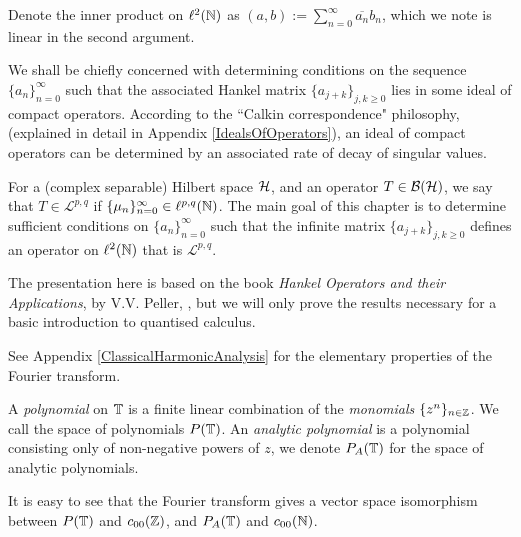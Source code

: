Denote the inner product on $\ell^2(\mathbb{N})$ 
as $(a,b) := \sum_{n=0}^\infty \overline{a_n}b_n$, which we note
is linear in the second argument.

We shall be chiefly concerned with determining conditions on the sequence $\{a_n\}_{n=0}^\infty$
such that the associated Hankel matrix $\{a_{j+k}\}_{j,k\geq 0}$ lies in some ideal
of compact operators. According to the ``Calkin correspondence" philosophy, (explained
in detail in Appendix \ref{IdealsOfOperators}), an ideal of compact operators
can be determined by an associated rate of decay of singular values.

For a (complex separable) Hilbert space $\mathcal{H}$, and an operator $T \in \mathcal{B}(\mathcal{H})$, 
we say that $T \in \mathcal{L}^{p,q}$ if $\{\mu_n\}_{n=0}^\infty \in \ell^{p,q}(\mathbb{N})$.
The main goal of this chapter is to determine sufficient conditions on $\{a_n\}_{n=0}^\infty$
such that the infinite matrix $\{a_{j+k}\}_{j,k\geq 0}$ defines an operator
on $\ell^2(\mathbb{N})$ that is $\mathcal{L}^{p,q}$.

The presentation here is based on the book \emph{Hankel Operators
and their Applications}, by V.V. Peller, \cite{Peller2003}, but we will only prove the results
necessary for a basic introduction to quantised calculus.


See Appendix \ref{ClassicalHarmonicAnalysis} for the elementary properties of the Fourier transform. 

A \emph{polynomial} on $\mathbb{T}$ is a finite linear combination of the \emph{monomials}
$\{z^n\}_{n \in \mathbb{Z}}$. We call the space of polynomials $P(\mathbb{T})$.
An \emph{analytic polynomial} is a polynomial consisting only of non-negative powers
of $z$, we denote $P_A(\mathbb{T})$ for the space of analytic polynomials. 

It is easy to see that the Fourier transform gives a vector space isomorphism between $P(\mathbb{T})$
and $c_{00}(\mathbb{Z})$, and $P_A(\mathbb{T})$ and $c_{00}(\mathbb{N})$.

